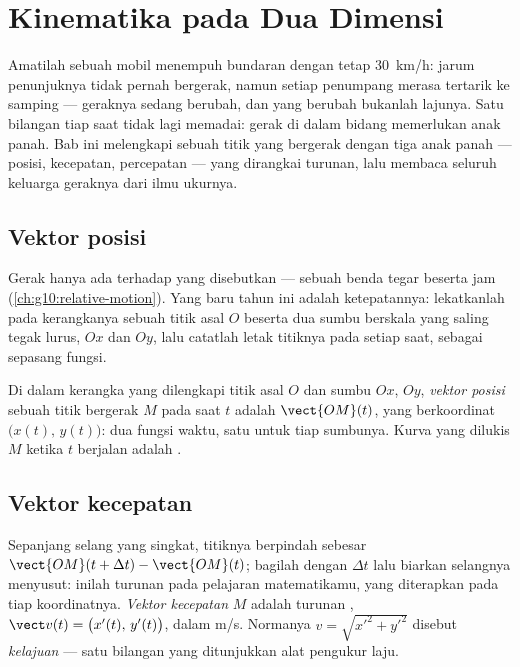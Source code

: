 \chapter{Kinematika pada Dua Dimensi}\label{ch:g12:kinematics-2d}

Amatilah sebuah mobil menempuh bundaran dengan tetap \qty{30}{km/h}:
jarum penunjuknya tidak pernah bergerak, namun setiap penumpang merasa
tertarik ke samping --- geraknya sedang berubah, dan yang berubah
bukanlah lajunya. Satu bilangan tiap saat tidak lagi memadai: gerak di
dalam bidang memerlukan anak panah. Bab ini melengkapi sebuah titik yang
bergerak dengan tiga anak panah --- posisi, kecepatan, percepatan ---
yang dirangkai turunan, lalu membaca seluruh keluarga geraknya dari ilmu
ukurnya.

\section{Vektor posisi}

Gerak hanya ada terhadap  yang disebutkan --- sebuah benda
tegar beserta jam (\cref{ch:g10:relative-motion}). Yang baru tahun ini
adalah ketepatannya: lekatkanlah pada kerangkanya sebuah titik asal $O$
beserta dua sumbu berskala yang saling tegak lurus, $Ox$ dan $Oy$, lalu
catatlah letak titiknya pada setiap saat, sebagai sepasang fungsi.

\begin{definition}\label{def:g12:kinematics-2d:position}
Di dalam kerangka yang dilengkapi titik asal $O$ dan sumbu $Ox$, $Oy$,
\emph{vektor posisi} sebuah titik bergerak $M$ pada
saat $t$ adalah $\vect{OM}(t)$, yang berkoordinat
$\bigl(x(t),\, y(t)\bigr)$: dua fungsi waktu, satu untuk tiap sumbunya.
Kurva yang dilukis $M$ ketika $t$ berjalan adalah .
\end{definition}

\section{Vektor kecepatan}

\begin{definition}\label{def:g12:kinematics-2d:velocity}
Sepanjang selang yang singkat, titiknya berpindah sebesar
$\vect{OM}(t+\Delta t) - \vect{OM}(t)$; bagilah dengan $\Delta t$ lalu
biarkan selangnya menyusut: inilah turunan pada pelajaran matematikamu,
yang diterapkan pada tiap koordinatnya. \emph{Vektor
kecepatan} $M$ adalah turunan ,
$\vect v(t) = \bigl(x'(t),\, y'(t)\bigr)$, dalam \unit{m/s}. Normanya
$v = \sqrt{x'^2 + y'^2}$ disebut \emph{kelajuan} ---
satu bilangan yang ditunjukkan alat pengukur laju.
\end{definition}

